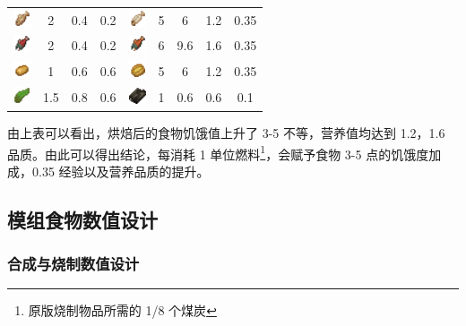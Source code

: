 \begin{center}
\begin{longtable}{cccc|cccc|c}
        \includegraphics[width=0.5cm,height=0.5cm]{./images/origin/cod.png} & 2 & 0.4 & 0.2 & \includegraphics[width=0.5cm,height=0.5cm]{./images/origin/cooked_cod.png} & 5 & 6 & 1.2 & 0.35 \\
        \includegraphics[width=0.5cm,height=0.5cm]{./images/origin/salmon.png} & 2 & 0.4 & 0.2 & \includegraphics[width=0.5cm,height=0.5cm]{./images/origin/cooked_salmon.png} & 6 & 9.6 & 1.6 & 0.35 \\
        \includegraphics[width=0.5cm,height=0.5cm]{./images/origin/potato.png} & 1 & 0.6 & 0.6 & \includegraphics[width=0.5cm,height=0.5cm]{./images/origin/baked_potato.png} & 5 & 6 & 1.2 & 0.35 \\
        \includegraphics[width=0.5cm,height=0.5cm]{./images/origin/kelp.png} & 1.5 & 0.8 & 0.6 & \includegraphics[width=0.5cm,height=0.5cm]{./images/origin/dried_kelp.png} & 1 & 0.6 & 0.6 & 0.1 \\
        \bottomrule
    \end{longtable}
\end{center}

由上表可以看出，烘焙后的食物饥饿值上升了 3-5 不等，营养值均达到 1.2，1.6 品质。由此可以得出结论，每消耗 1 单位燃料\footnote{原版烧制物品所需的 1/8 个煤炭}，会赋予食物 3-5 点的饥饿度加成，0.35 经验以及营养品质的提升。

\subsection{模组食物数值设计}

\subsubsection{合成与烧制数值设计}

